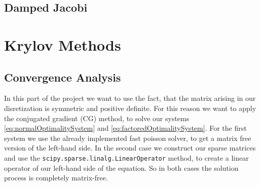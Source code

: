 \documentclass{amsart}
\theoremstyle{definition}
\theoremstyle{remark}
\numberwithin{equation}{section}
\begin{document}
\subsection{Damped Jacobi}
\label{sec:DampedJacobi}
\newpage
\section{Krylov Methods}

\subsection{Convergence Analysis}
In this part of the project we want to use the fact, that the matrix arising in our disretization is symmetric and positive definite. For this reason we 
want to apply the conjugated gradient (CG) method, to solve our systems \eqref{eq:normalOptimalitySystem} and \eqref{eq:factoredOptimalitySystem}.
For the first system we use the already implemented fast poisson solver, to get a matrix free version of the left-hand side. In the second case we 
construct our sparse matrices and use the \texttt{scipy.sparse.linalg.LinearOperator} method, to create a linear operator of our left-hand side of the 
equation. So in both cases the solution process is completely matrix-free.
\end{document}

